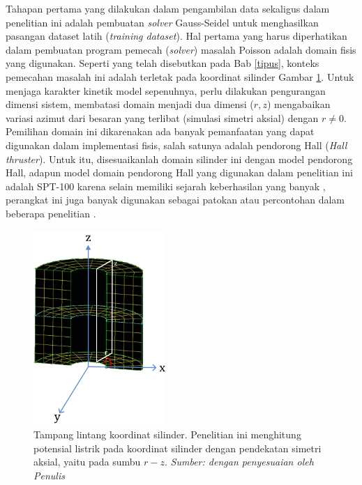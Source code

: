 Tahapan pertama yang dilakukan dalam pengambilan data sekaligus dalam penelitian
ini adalah pembuatan \emph{solver} Gauss-Seidel untuk menghasilkan pasangan
dataset latih (\emph{training dataset}). Hal pertama yang harus diperhatikan
dalam pembuatan program pemecah (\emph{solver}) masalah Poisson adalah domain fisis
yang digunakan. Seperti yang telah disebutkan pada Bab \ref{tipus}, konteks pemecahan
masalah ini adalah terletak pada koordinat silinder Gambar \ref{domain_silinder}.
Untuk menjaga karakter kinetik model sepenuhnya, perlu dilakukan pengurangan dimensi
sistem, membatasi domain menjadi dua dimensi ($r,z$) mengabaikan variasi azimut
dari besaran yang terlibat (simulasi simetri aksial) \citep{f_taccogna_longo_capitelli_schneider_2005}
dengan $r \neq 0$. Pemilihan domain ini dikarenakan ada banyak pemanfaatan yang
dapat digunakan dalam implementasi fisis, salah satunya adalah pendorong Hall (\emph{Hall
thruster}). Untuk itu, disesuaikanlah domain silinder ini dengan model pendorong
Hall, adapun model domain pendorong Hall yang digunakan dalam penelitian ini adalah
SPT-100 karena selain memiliki sejarah keberhasilan yang banyak \citep{braga_miranda_2019},
perangkat ini juga banyak digunakan sebagai patokan atau percontohan dalam beberapa
penelitian \citep{Shiferaw2013, f_taccogna_longo_capitelli_schneider_2005, braga_miranda_2019, boeuf_2017}.

\begin{figure}[h!]
  \centering
  \includegraphics[width=5cm]{gambar/silinder.png}
  \caption{Tampang lintang koordinat silinder. Penelitian ini menghitung potensial
  listrik pada koordinat silinder dengan pendekatan simetri aksial, yaitu pada
  sumbu $r-z$.\emph{ Sumber: \citep{Shiferaw2013} dengan penyesuaian oleh Penulis}}
  \label{domain_silinder}
\end{figure}

